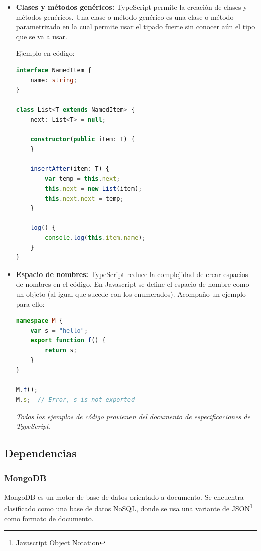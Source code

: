 \documentclass[spanish,12pt, a4paper, twoside]{paper}
\begin{document}
\begin{itemize}
\item\textbf{Clases y métodos genéricos:} TypeScript permite la creación de clases y métodos genéricos. Una clase o método genérico es una clase o método parametrizado en la cual permite usar el tipado fuerte sin conocer aún el tipo que se va a usar.

Ejemplo en código:
\begin{lstlisting}[language=TypeScript]
interface NamedItem {  
    name: string;  
}

class List<T extends NamedItem> {  
    next: List<T> = null;

    constructor(public item: T) {  
    }

    insertAfter(item: T) {  
        var temp = this.next;  
        this.next = new List(item);  
        this.next.next = temp;  
    }

    log() {  
        console.log(this.item.name);  
    }
}
\end{lstlisting}

\item\textbf{Espacio de nombres:} TypeScript reduce la complejidad de crear espacios de nombres en el código. En Javascript se define el espacio de nombre como un objeto (al igual que sucede con los enumerados). Acompaño un ejemplo para ello:

\begin{lstlisting}[language=TypeScript]
namespace M {  
    var s = "hello";  
    export function f() {  
        return s;  
    }  
}

M.f();  
M.s;  // Error, s is not exported
\end{lstlisting}

\emph{Todos los ejemplos de código provienen del documento de especificaciones de TypeScript.}

\end{itemize}

\subsection{Dependencias}

\subsubsection{MongoDB}

MongoDB es un motor de base de datos orientado a documento. Se encuentra clasificado como una base de datos NoSQL, donde se usa una variante de JSON\footnote{Javascript Object Notation} como formato de documento.
\end{document}
